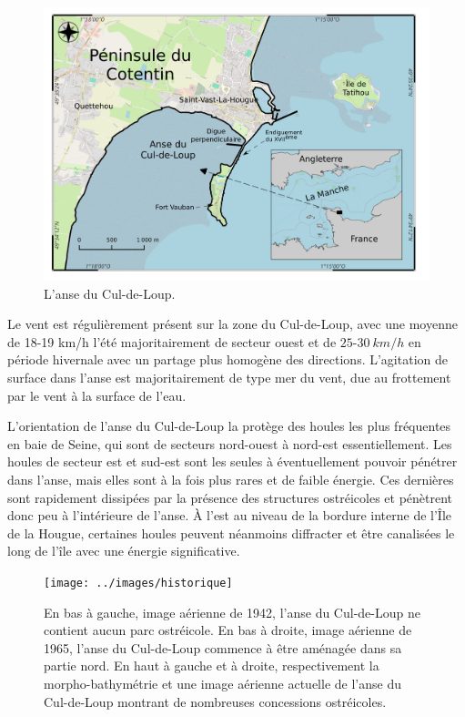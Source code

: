 \documentclass[10pt,a4paper,titlepage]{article}
\begin{document}
    \begin{figure}[!h]
        \centering
        \includegraphics[width=0.8\linewidth]{../images/carte-ADCL}
        \caption[anse du Cul-de-Loup.]{L'anse du Cul-de-Loup.}
        \label{fig:carte-adcl}
    \end{figure}

    Le vent est régulièrement présent sur la zone du Cul-de-Loup, avec une moyenne de 18-19 km/h l'été majoritairement de secteur ouest et de $25$-$30~km/h$ en période hivernale avec un partage plus homogène des directions. L'agitation de surface dans l'anse est majoritairement de type mer du vent, due au frottement par le vent à la surface de l'eau.

    L'orientation de l'anse du Cul-de-Loup la protège des houles les plus fréquentes en baie de Seine, qui sont de secteurs nord-ouest à nord-est essentiellement. Les houles de secteur est et sud-est sont les seules à éventuellement pouvoir pénétrer dans l'anse, mais elles sont à la fois plus rares et de faible énergie. Ces dernières sont rapidement dissipées par la présence des structures ostréicoles et pénètrent donc peu à l'intérieure de l'anse. À l'est au niveau de la bordure interne de l'Île de la Hougue, certaines houles peuvent néanmoins diffracter et être canalisées le long de l'île avec une énergie significative.

    \begin{figure}[!h]
        \centering
        \texttt{[image: ../images/historique]}
        \caption[Évolution de l'anse du Cul-de-Loup]{En bas à gauche, image aérienne de 1942, l'anse du Cul-de-Loup ne contient aucun parc ostréicole. En bas à droite, image aérienne de 1965, l'anse du Cul-de-Loup commence à être aménagée dans sa partie nord. En haut à gauche et à droite, respectivement la morpho-bathymétrie  et une image aérienne actuelle de l'anse du Cul-de-Loup montrant de nombreuses concessions ostréicoles. \parencite{geoportail}}
        \label{fig:historique-adcl}
    \end{figure}
\end{document}
